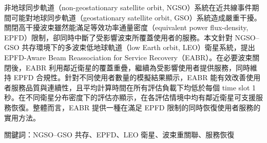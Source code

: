 \begin{abstractCH}

非地球同步軌道（non-geostationary satellite orbit, NGSO）系統在近共線事件期間可能對地球同步軌道（geostationary satellite orbit, GSO）系統造成嚴重干擾。關閉高干擾波束雖然能滿足等效功率通量密度（equivalent power flux-density, EPFD）限制，卻同時中斷了受影響波束所覆蓋使用者的服務。本文針對 NGSO--GSO 共存環境下的多波束低地球軌道（low Earth orbit, LEO）衛星系統，提出 EPFD-Aware Beam Reassociation for Service Recovery（EABR）。在必要波束關閉後，EABR 利用鄰近衛星的覆蓋重疊，繼續為受影響使用者提供服務，同時維持 EPFD 合規性。針對不同使用者數量的模擬結果顯示，EABR 能有效改善使用者服務品質與連續性，且平均計算時間在所有評估負載下均低於每個 time slot 1 秒。在不同衛星分布密度下的評估亦顯示，在各評估情境中均有鄰近衛星可支援服務恢復。整體而言，EABR 提供一種在滿足 EPFD 限制的同時恢復使用者服務的實用方法。

關鍵詞：NGSO--GSO 共存、EPFD、LEO 衛星、波束重關聯、服務恢復

\end{abstractCH}
